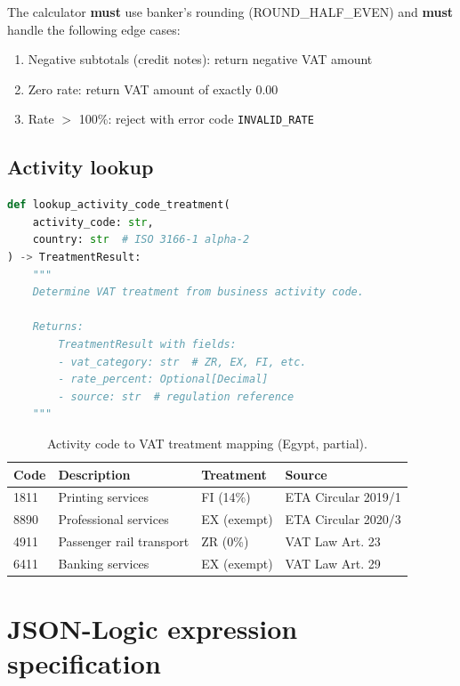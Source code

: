 The calculator \textbf{must} use banker's rounding (ROUND\_HALF\_EVEN) and
\textbf{must} handle the following edge cases:

\begin{enumerate}
  \item Negative subtotals (credit notes): return negative VAT amount
  \item Zero rate: return VAT amount of exactly 0.00
  \item Rate $>$ 100\%: reject with error code \texttt{INVALID\_RATE}
\end{enumerate}

\subsection{Activity lookup}

\begin{lstlisting}[language=Python,basicstyle=\ttfamily\small,caption={Activity lookup API contract.}]
def lookup_activity_code_treatment(
    activity_code: str,
    country: str  # ISO 3166-1 alpha-2
) -> TreatmentResult:
    """
    Determine VAT treatment from business activity code.
    
    Returns:
        TreatmentResult with fields:
        - vat_category: str  # ZR, EX, FI, etc.
        - rate_percent: Optional[Decimal]
        - source: str  # regulation reference
    """
\end{lstlisting}

\begin{table}[htbp]
\centering
\caption{Activity code to VAT treatment mapping (Egypt, partial).}
\label{tab:activity-lookup}
\footnotesize
\begin{tabularx}{\linewidth}{@{}l l l X@{}}
\toprule
\textbf{Code} & \textbf{Description} & \textbf{Treatment} & \textbf{Source} \\ \midrule
1811 & Printing services & FI (14\%) & ETA Circular 2019/1 \\
8890 & Professional services & EX (exempt) & ETA Circular 2020/3 \\
4911 & Passenger rail transport & ZR (0\%) & VAT Law Art. 23 \\
6411 & Banking services & EX (exempt) & VAT Law Art. 29 \\
\bottomrule
\end{tabularx}
\end{table}

\section{JSON-Logic expression specification}

